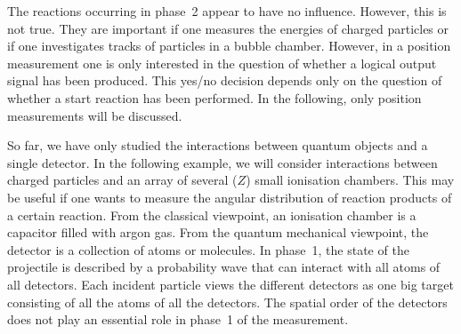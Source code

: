 \documentclass[12pt]{article}
\begin{document}
The reactions occurring in phase~2 appear to have no influence.  
However, this is not true.  They are important if one measures the energies of charged particles or if one investigates tracks of particles in a bubble chamber.  
However, in a position measurement one is only interested in the question of whether a logical output signal has been produced.  This yes/no decision depends only on the question of whether a start reaction has been performed.
In the following, only position measurements will be discussed.  

So far, we have only studied the interactions between quantum objects and a single detector.  In the following example, we will consider interactions between charged particles and an array of several ($Z$) small ionisation chambers.  
This may be useful if one wants to measure the angular distribution of reaction products of a certain reaction.  
From the classical viewpoint, an ionisation chamber is a capacitor filled with argon gas.  From the quantum mechanical viewpoint, the detector is a collection of atoms or molecules.  
In phase~1, the state of the projectile is described by a probability wave that can interact with all atoms of all detectors.  Each incident particle views the different detectors as one big target consisting of all the atoms of all the detectors.  
The spatial order of the detectors does not play an essential role in phase~1 of the measurement.  
\end{document}

